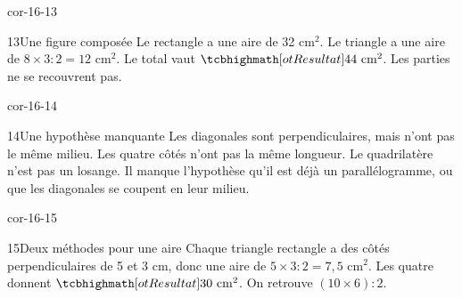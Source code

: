 \begin{blocLivre}{cor-16-13}\begin{corrige}{13}{Une figure composée}
Le rectangle a une aire de 32 cm$^2$. Le triangle a une aire de $8\times3:2=12$ cm$^2$. Le total vaut $\res{44\ \mathrm{cm}^2}$. Les parties ne se recouvrent pas.
\label{fig-cor-16-13}
\end{corrige}\end{blocLivre}
\begin{blocLivre}{cor-16-14}\begin{corrige}{14}{Une hypothèse manquante}
Les diagonales sont perpendiculaires, mais n’ont pas le même milieu. Les quatre côtés n’ont pas la même longueur. Le quadrilatère n’est pas un losange. Il manque l’hypothèse qu’il est déjà un parallélogramme, ou que les diagonales se coupent en leur milieu.
\label{fig-cor-16-14}
\end{corrige}\end{blocLivre}
\begin{blocLivre}{cor-16-15}\begin{corrige}{15}{Deux méthodes pour une aire}
Chaque triangle rectangle a des côtés perpendiculaires de 5 et 3 cm, donc une aire de $5\times3:2=7{,}5$ cm$^2$. Les quatre donnent $\res{30\ \mathrm{cm}^2}$. On retrouve $(10\times6):2$.
\label{fig-cor-16-15}
\end{corrige}\end{blocLivre}
